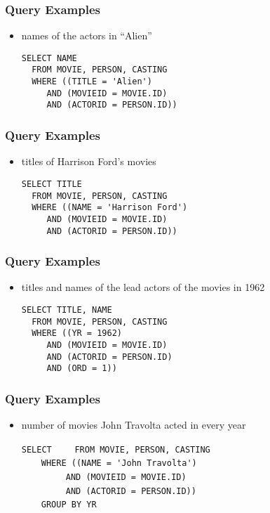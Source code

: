 \documentclass[dvipsnames]{beamer}
\theoremstyle{plain}
\begin{document}
\begin{frame}[fragile]
  \frametitle{Query Examples}

  \begin{itemize}
    \item names of the actors in ``Alien''
     \begin{lstlisting}
SELECT NAME
  FROM MOVIE, PERSON, CASTING
  WHERE ((TITLE = 'Alien')
     AND (MOVIEID = MOVIE.ID)
     AND (ACTORID = PERSON.ID))
      \end{lstlisting}
    \end{itemize}
\end{frame}

\begin{frame}[fragile]
  \frametitle{Query Examples}

  \begin{itemize}
    \item titles of Harrison Ford's movies
    \begin{lstlisting}
SELECT TITLE
  FROM MOVIE, PERSON, CASTING
  WHERE ((NAME = 'Harrison Ford')
     AND (MOVIEID = MOVIE.ID)
     AND (ACTORID = PERSON.ID))
    \end{lstlisting}
  \end{itemize}
\end{frame}

\begin{frame}[fragile]
  \frametitle{Query Examples}

  \begin{itemize}
    \item titles and names of the lead actors of the movies in 1962
    \begin{lstlisting}
SELECT TITLE, NAME
  FROM MOVIE, PERSON, CASTING
  WHERE ((YR = 1962)
     AND (MOVIEID = MOVIE.ID)
     AND (ACTORID = PERSON.ID)
     AND (ORD = 1))
    \end{lstlisting}
  \end{itemize}
\end{frame}

\begin{frame}[fragile]
  \frametitle{Query Examples}

  \begin{itemize}
    \item number of movies John Travolta acted in every year

    \medskip
\lstinline!SELECT! 
~~~~\lstinline!FROM MOVIE, PERSON, CASTING!\\
\pause
~~~~\lstinline!WHERE ((NAME = 'John Travolta')!\\
~~~~~~~~~\lstinline!AND (MOVIEID = MOVIE.ID)!\\
~~~~~~~~~\lstinline!AND (ACTORID = PERSON.ID))!\\
\pause
~~~~\lstinline!GROUP BY YR!
  \end{itemize}
\end{frame}
\end{document}
